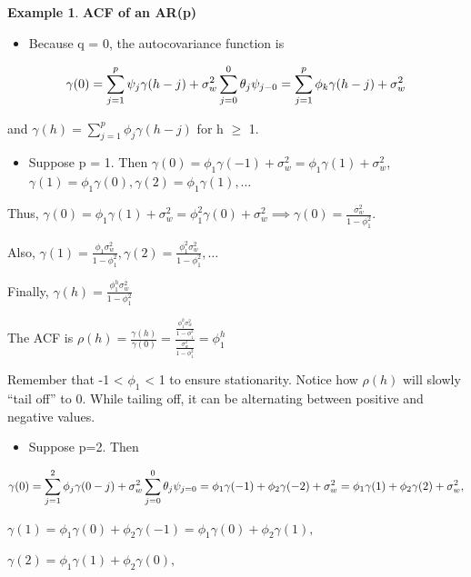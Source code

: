 \documentclass[
]{book}
\providecommand{\tightlist}{%
  \setlength{\itemsep}{0pt}\setlength{\parskip}{0pt}}
\theoremstyle{definition}
\theoremstyle{definition}
\newtheorem{example}{Example}[chapter]
\theoremstyle{definition}
\theoremstyle{definition}
\theoremstyle{remark}
\begin{document}
\begin{example}
\textbf{ACF of an AR(p)}

\begin{itemize}
\tightlist
\item
  Because q = 0, the autocovariance function is
\end{itemize}

\[\gamma(0) =\sum_{j=1}^{p}\psi_j\gamma(h-j)+\sigma_w^2\sum_{j=0}^{0}\theta_j\psi_{j-0}\\
=\sum_{j=1}^{p}\phi_k\gamma(h-j)+\sigma_w^2\]

and \(\gamma(h) =\sum_{j=1}^{p}\phi_j\gamma(h-j)\) for h \(\ge\) 1.

\begin{itemize}
\tightlist
\item
  Suppose p = 1. Then \(\gamma(0) =\phi_1\gamma(-1)+\sigma_w^2 = \phi_1\gamma(1)+\sigma_w^2\),
  \(\gamma(1) = \phi_1\gamma(0), \gamma(2) = \phi_1\gamma(1), …\)
\end{itemize}

Thus, \(\gamma(0) = \phi_1\gamma(1)+\sigma_w^2 = \phi_1^2\gamma(0)+\sigma_w^2 \implies \gamma(0)=\frac{\sigma_w^2}{1-\phi_1^2}\).

Also, \(\gamma(1) =\frac{\phi_1\sigma_w^2}{1-\phi_1^2}, \gamma(2) =\frac{\phi_1^2\sigma_w^2}{1-\phi_1^2}, …\)

Finally, \(\gamma(h) = \frac{\phi_1^h\sigma_w^2}{1-\phi_1^2}\)

The ACF is \(\rho(h) = \frac{\gamma(h)}{\gamma(0)}=\frac{\frac{\phi_1^h\sigma_w^2}{1-\phi_1^2}}{\frac{\sigma_w^2}{1-\phi_1^2}}=\phi_1^h\)

Remember that -1 \textless{} \(\phi_1\) \textless{} 1 to ensure stationarity. Notice how \(\rho(h)\) will slowly ``tail off'' to 0. While tailing off, it can be alternating between positive and negative values.

\begin{itemize}
\tightlist
\item
  Suppose p=2. Then
\end{itemize}

\[\gamma(0)=\sum_{j=1}^{2}\phi_j\gamma(0-j)+\sigma_w^2\sum_{j=0}^{0}\theta_j\psi_{j=0}\\
=\phi_1\gamma(-1)+\phi_2\gamma(-2)+\sigma_w^2\\
=\phi_1\gamma(1)+\phi_2\gamma(2)+\sigma_w^2,\]

\(\gamma(1) = \phi_1\gamma(0) + \phi_2\gamma(-1) = \phi_1\gamma(0) + \phi_2\gamma(1),\)

\(\gamma(2) = \phi_1\gamma(1) + \phi_2\gamma(0),\)


\end{example}
\end{document}
